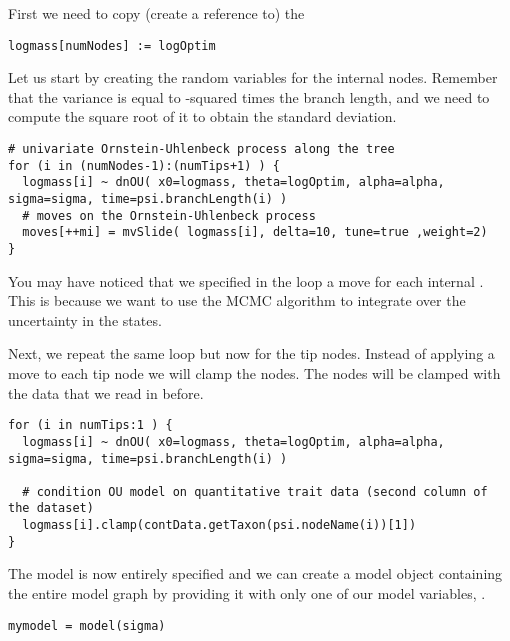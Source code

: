 First we need to copy (create a reference to) the 
{\tt \small \begin{snugshade*}
\begin{lstlisting}
logmass[numNodes] := logOptim
\end{lstlisting}
\end{snugshade*}}
Let us start by creating the random variables for the internal nodes. Remember that the variance is equal to -squared times the branch length, and we need to compute the square root of it to obtain the standard deviation.
{\tt \small \begin{snugshade*}
\begin{lstlisting}
# univariate Ornstein-Uhlenbeck process along the tree
for (i in (numNodes-1):(numTips+1) ) {
  logmass[i] ~ dnOU( x0=logmass, theta=logOptim, alpha=alpha, sigma=sigma, time=psi.branchLength(i) )
  # moves on the Ornstein-Uhlenbeck process
  moves[++mi] = mvSlide( logmass[i], delta=10, tune=true ,weight=2) 
}
\end{lstlisting}
\end{snugshade*}}
You may have noticed that we specified in the loop a move for each internal . This is because we want to use the MCMC algorithm to integrate over the uncertainty in the states.

Next, we repeat the same loop but now for the tip nodes. Instead of applying a move to each tip node we will clamp the nodes. The nodes will be clamped with the data that we read in before.
{\tt \small \begin{snugshade*}
\begin{lstlisting}
for (i in numTips:1 ) {
  logmass[i] ~ dnOU( x0=logmass, theta=logOptim, alpha=alpha, sigma=sigma, time=psi.branchLength(i) )

  # condition OU model on quantitative trait data (second column of the dataset)
  logmass[i].clamp(contData.getTaxon(psi.nodeName(i))[1])
}
\end{lstlisting}
\end{snugshade*}}

The model is now entirely specified and we can create a model object containing the entire model graph by providing it with only one of our model variables, \EG {}. 
{\tt \small \begin{snugshade*}
\begin{lstlisting}
mymodel = model(sigma)
\end{lstlisting}
\end{snugshade*}}

